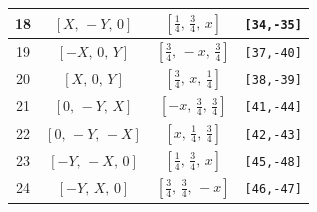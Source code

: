 \documentclass[fleqn,8pt]{jsarticle}
\begin{document}
\begin{longtable}{cccc}
18 & $\left[ X,\, - Y,\, 0 \right]$ & $\left[ \frac{1}{4},\, \frac{3}{4},\, x \right]$ & {\tt [34,-35]} \\ \hline
19 & $\left[ - X,\, 0,\, Y \right]$ & $\left[ \frac{3}{4},\, - x,\, \frac{3}{4} \right]$ & {\tt [37,-40]} \\ \hline
20 & $\left[ X,\, 0,\, Y \right]$ & $\left[ \frac{3}{4},\, x,\, \frac{1}{4} \right]$ & {\tt [38,-39]} \\ \hline
21 & $\left[ 0,\, - Y,\, X \right]$ & $\left[ - x,\, \frac{3}{4},\, \frac{3}{4} \right]$ & {\tt [41,-44]} \\ \hline
22 & $\left[ 0,\, - Y,\, - X \right]$ & $\left[ x,\, \frac{1}{4},\, \frac{3}{4} \right]$ & {\tt [42,-43]} \\ \hline
23 & $\left[ - Y,\, - X,\, 0 \right]$ & $\left[ \frac{1}{4},\, \frac{3}{4},\, x \right]$ & {\tt [45,-48]} \\ \hline
24 & $\left[ - Y,\, X,\, 0 \right]$ & $\left[ \frac{3}{4},\, \frac{3}{4},\, - x \right]$ & {\tt [46,-47]} \\
\end{longtable}
\renewcommand{\arraystretch}{1.2}
\end{document}
